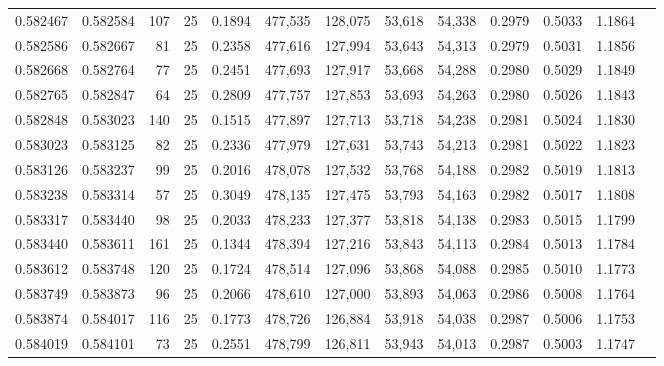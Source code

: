 \begin{tabular}{rrrrrrrrrrrrr}
0.582467 & 0.582584 &   107 &  25 &                                     0.1894 & 477,535 & 128,075 &  53,618 &  54,338 & 0.2979 & 0.5033 & 1.1864 \\
0.582586 & 0.582667 &    81 &  25 &                                     0.2358 & 477,616 & 127,994 &  53,643 &  54,313 & 0.2979 & 0.5031 & 1.1856 \\
0.582668 & 0.582764 &    77 &  25 &                                     0.2451 & 477,693 & 127,917 &  53,668 &  54,288 & 0.2980 & 0.5029 & 1.1849 \\
0.582765 & 0.582847 &    64 &  25 &                                     0.2809 & 477,757 & 127,853 &  53,693 &  54,263 & 0.2980 & 0.5026 & 1.1843 \\
0.582848 & 0.583023 &   140 &  25 &                                     0.1515 & 477,897 & 127,713 &  53,718 &  54,238 & 0.2981 & 0.5024 & 1.1830 \\
0.583023 & 0.583125 &    82 &  25 &                                     0.2336 & 477,979 & 127,631 &  53,743 &  54,213 & 0.2981 & 0.5022 & 1.1823 \\
0.583126 & 0.583237 &    99 &  25 &                                     0.2016 & 478,078 & 127,532 &  53,768 &  54,188 & 0.2982 & 0.5019 & 1.1813 \\
0.583238 & 0.583314 &    57 &  25 &                                     0.3049 & 478,135 & 127,475 &  53,793 &  54,163 & 0.2982 & 0.5017 & 1.1808 \\
0.583317 & 0.583440 &    98 &  25 &                                     0.2033 & 478,233 & 127,377 &  53,818 &  54,138 & 0.2983 & 0.5015 & 1.1799 \\
0.583440 & 0.583611 &   161 &  25 &                                     0.1344 & 478,394 & 127,216 &  53,843 &  54,113 & 0.2984 & 0.5013 & 1.1784 \\
0.583612 & 0.583748 &   120 &  25 &                                     0.1724 & 478,514 & 127,096 &  53,868 &  54,088 & 0.2985 & 0.5010 & 1.1773 \\
0.583749 & 0.583873 &    96 &  25 &                                     0.2066 & 478,610 & 127,000 &  53,893 &  54,063 & 0.2986 & 0.5008 & 1.1764 \\
0.583874 & 0.584017 &   116 &  25 &                                     0.1773 & 478,726 & 126,884 &  53,918 &  54,038 & 0.2987 & 0.5006 & 1.1753 \\
0.584019 & 0.584101 &    73 &  25 &                                     0.2551 & 478,799 & 126,811 &  53,943 &  54,013 & 0.2987 & 0.5003 & 1.1747 \\

\end{tabular}
